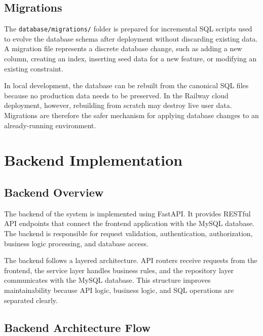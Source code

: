 ﻿\documentclass{article}
\begin{document}
\subsection{Migrations}

The \texttt{database/migrations/} folder is prepared for incremental SQL scripts used to evolve 
the database schema after deployment without discarding existing data. A migration file 
represents a discrete database change, such as adding a new column, creating an index, inserting 
seed data for a new feature, or modifying an existing constraint.

In local development, the database can be rebuilt from the canonical SQL files because no 
production data needs to be preserved. In the Railway cloud deployment, however, rebuilding 
from scratch may destroy live user data. Migrations are therefore the safer mechanism for 
applying database changes to an already-running environment.

\section{Backend Implementation}

\subsection{Backend Overview}

The backend of the system is implemented using FastAPI. It provides RESTful API endpoints that connect the frontend application with the MySQL database. The backend is responsible for request validation, authentication, authorization, business logic processing, and database access.

The backend follows a layered architecture. API routers receive requests from the frontend, the service layer handles business rules, and the repository layer communicates with the MySQL database. This structure improves maintainability because API logic, business logic, and SQL operations are separated clearly.

\subsection{Backend Architecture Flow}
\end{document}
